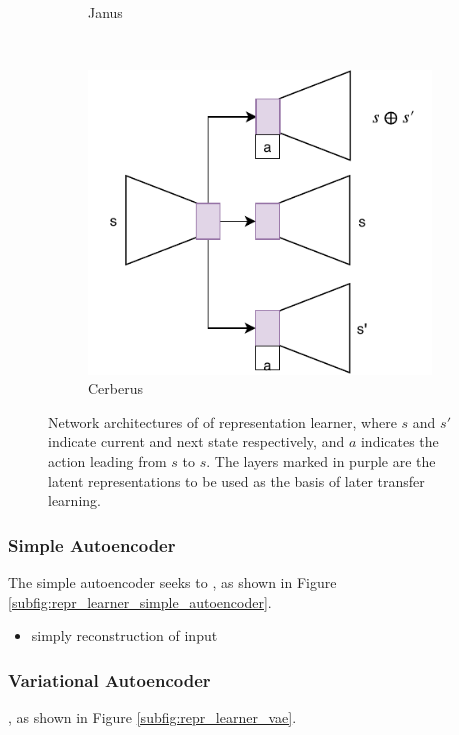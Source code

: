 \begin{figure}[ht!]
\begin{subfigure}{0.5\columnwidth}
		\caption{Janus}
		\label{subfig:repr_learner_janus}
	\end{subfigure}%
	~ 
	\begin{subfigure}{0.5\columnwidth}
		\centering
		\includegraphics[width=\linewidth]{../img/cerberus.pdf}
		\caption{Cerberus}
		\label{subfig:repr_learner_cerberus}
	\end{subfigure}
	\caption{Network architectures of of representation learner, where $s$ and $s'$ indicate current and next state respectively, and $a$ indicates the action leading from $s$ to $s$. The layers marked in purple are the latent representations to be used as the basis of later transfer learning.}
	\label{fig:repr_learner}
\end{figure}


\subsubsection{Simple Autoencoder}
The simple autoencoder seeks to 
, as shown in Figure \ref{subfig:repr_learner_simple_autoencoder}.

\begin{itemize}
	\item simply reconstruction of input
\end{itemize}

\subsubsection{Variational Autoencoder}
, as shown in Figure \ref{subfig:repr_learner_vae}.

